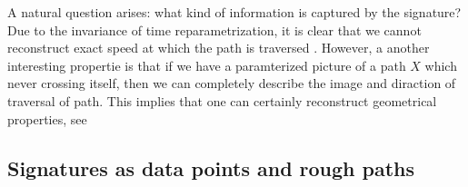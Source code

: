 A natural question arises: what kind of information is captured by the signature?
Due to the invariance of time reparametrization, it is clear that we cannot reconstruct exact speed at which the path is traversed \cite{chevyrev2016primer}.
However, a another interesting propertie is that if we have a paramterized picture of a  path $X$ which never crossing itself, then we can completely describe the image and diraction of traversal of path. This implies that one can certainly
reconstruct geometrical properties, see \cite{lyons2017hyperbolic, chang2019insertion, geng2017reconstruction}





\subsection{Signatures as data points and rough paths}%
\label{sub:signatures_as_data_points_and_rough_paths}


